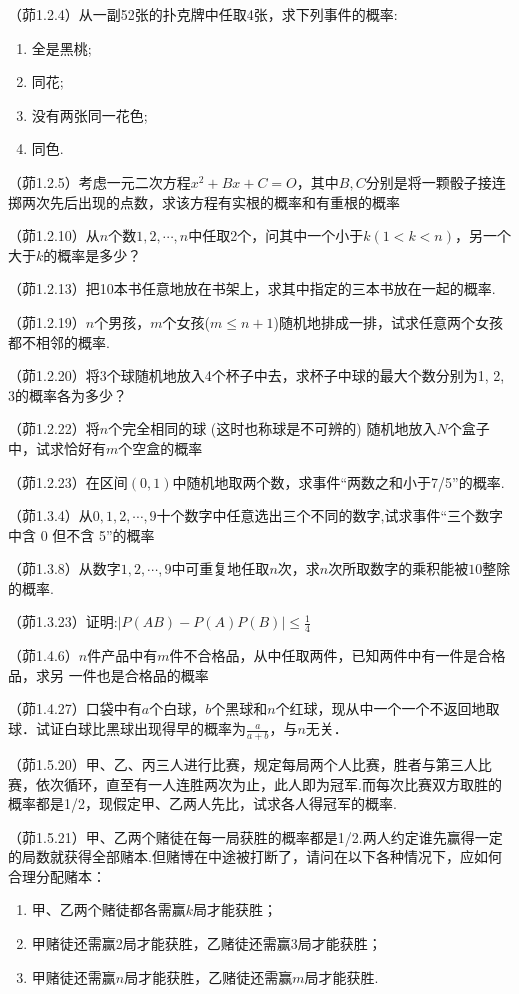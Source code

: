 \begin{problemset}[错题记录]
    \item （茆1.2.4）从一副52张的扑克牌中任取4张，求下列事件的概率:
    \begin{enumerate}
        \item 全是黑桃;
        \item 同花;
        \item 没有两张同一花色;
        \item 同色.
    \end{enumerate}
    \item （茆1.2.5）考虑一元二次方程$x^2+Bx+C=O$，其中$B,C$分别是将一颗骰子接连掷两次先后出现的点数，求该方程有实根的概率和有重根的概率
    \item （茆1.2.10）从$n$个数$1, 2, \cdots, n$中任取2个，问其中一个小于$k (1 < k < n)$，另一个大于$k$的概率是多少？
    \item （茆1.2.13）把10本书任意地放在书架上，求其中指定的三本书放在一起的概率.
    \item （茆1.2.19）$n$个男孩，$m$个女孩($m \le n + 1$)随机地排成一排，试求任意两个女孩都不相邻的概率.
    \item （茆1.2.20）将3个球随机地放入4个杯子中去，求杯子中球的最大个数分别为1, 2, 3的概率各为多少？
    \item （茆1.2.22）将$n$个完全相同的球 (这时也称球是不可辨的) 随机地放入$N$个盒子中，试求恰好有$m$个空盒的概率
    \item （茆1.2.23）在区间$(0,1)$中随机地取两个数，求事件“两数之和小于7/5”的概率.
    \item （茆1.3.4）从$0, 1, 2, \cdots ,9$十个数字中任意选出三个不同的数字,试求事件“三个数字中含 0 但不含 5”的概率
    \item （茆1.3.8）从数字$1, 2, \cdots ,9$中可重复地任取$n$次，求$n$次所取数字的乘积能被$10$整除的概率.
    \item （茆1.3.23）证明:$\lvert P(AB) - P(A)P(B) \rvert \le \frac1{4}$
    \item （茆1.4.6）$n$件产品中有$m$件不合格品，从中任取两件，已知两件中有一件是合格品，求另 一件也是合格品的概率
    \item （茆1.4.27）口袋中有$a$个白球，$b$个黑球和$n$个红球，现从中一个一个不返回地取球．试证白球比黑球出现得早的概率为$\frac{a}{a+b}$，与$n$无关．
    \item （茆1.5.20）甲、乙、丙三人进行比赛，规定每局两个人比赛，胜者与第三人比赛，依次循环，直至有一人连胜两次为止，此人即为冠军.而每次比赛双方取胜的概率都是1/2，现假定甲、乙两人先比，试求各人得冠军的概率.
    \item （茆1.5.21）甲、乙两个赌徒在每一局获胜的概率都是1/2.两人约定谁先赢得一定的局数就获得全部赌本.但赌博在中途被打断了，请问在以下各种情况下，应如何合理分配赌本：
    \begin{enumerate}
      \item 甲、乙两个赌徒都各需赢$k$局才能获胜；
      \item 甲赌徒还需赢2局才能获胜，乙赌徒还需赢3局才能获胜；
      \item 甲赌徒还需赢$n$局才能获胜，乙赌徒还需赢$m$局才能获胜.
    \end{enumerate}
\end{problemset}
